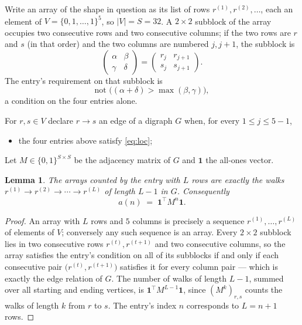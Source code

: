 \documentclass[11pt,a4paper]{article}
\theoremstyle{plain}
\newtheorem{lemma}[theorem]{Lemma}
\theoremstyle{definition}
\begin{document}
Write an array of the shape in question as its list of rows
$r^{(1)},r^{(2)},\dots$, each an element of
$V=\{0,1,\dots,1\}^{5}$, so $|V|=S=32$. A $2\times2$ subblock of the array
occupies two consecutive rows and two consecutive columns; if the two rows are $r$
and $s$ (in that order) and the two columns are numbered $j,j+1$,
the subblock is
\[
\begin{pmatrix}\alpha&\beta\\\gamma&\delta\end{pmatrix}=\begin{pmatrix}r_j&r_{j+1}\\s_j&s_{j+1}\end{pmatrix}.
\]
The entry's requirement on that subblock is
\begin{equation}\label{eq:loc}
\text{not }\bigl((\alpha+\delta)>\max(\beta,\gamma)\bigr),
\end{equation}
a condition on the four entries alone.

For $r,s\in V$ declare $r\to s$ an edge of a digraph $G$ when, for every
$1\le j\le 5-1$,
\begin{itemize}
\item the four entries above satisfy \eqref{eq:loc};

\end{itemize}
Let $M\in\{0,1\}^{S\times S}$ be the adjacency matrix of $G$ and $\mathbf{1}$ the
all-ones vector.

\begin{lemma}\label{lem:walk}
The arrays counted by the entry with $L$ rows are exactly the walks
$r^{(1)}\to r^{(2)}\to\cdots\to r^{(L)}$ of length $L-1$ in $G$. Consequently
\[
a(n)\;=\;\mathbf{1}^{\!\top}M^{n}\mathbf{1} .
\]
\end{lemma}

\begin{proof}
An array with $L$ rows and $5$ columns is precisely a sequence
$r^{(1)},\dots,r^{(L)}$ of elements of $V$; conversely any such sequence is an array.
Every $2\times2$ subblock lies in two consecutive rows $r^{(t)},r^{(t+1)}$ and two
consecutive columns, so the array satisfies the entry's condition on all of its subblocks
if and only if each consecutive pair $\bigl(r^{(t)},r^{(t+1)}\bigr)$ satisfies it for
every column pair --- which is exactly the edge relation of $G$. The number of walks of
length $L-1$, summed over all starting and ending vertices, is
$\mathbf{1}^{\!\top}M^{L-1}\mathbf{1}$, since $(M^{k})_{r,s}$ counts the walks of
length $k$ from $r$ to $s$. The entry's index $n$ corresponds to $L=n+1$ rows.
\end{proof}
\end{document}
